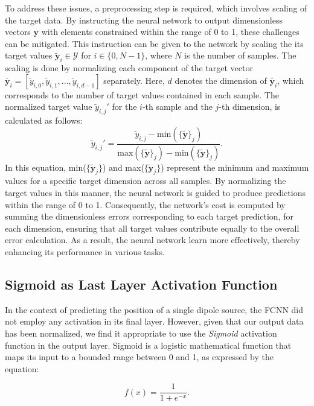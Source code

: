 \documentclass[a4paper, UKenglish, 11pt]{uiomaster}
\begin{document}
To address these issues, a preprocessing step is required, which involves scaling of the target data. By instructing the neural network to output dimensionless vectors $\textbf{{y}}$ with elements constrained within the range of 0 to 1, these challenges can be mitigated.
This instruction can be given to the network by scaling the its target values
$\mathbf{\tilde{y}}_i \in \mathcal{Y}$
for $i \in \{0, N-1\}$, where $N$ is the number of samples. The scaling is done by normalizing each component of the target vector
$\tilde{\mathbf{y}_i} = [\tilde{y}_{i,0}, \tilde{y}_{i,1}, ..., \tilde{y}_{i,d-1}]$
separately. Here, $d$ denotes the dimension of $\tilde{\mathbf{y}_i}$, which corresponds to the number of target values contained in each sample. The normalized target value $\tilde{y}_{i,j}'$ for the $i$-th sample and the $j$-th dimension, is calculated as follows:
\begin{equation}
  \tilde{y}_{i,j}' = \frac{\tilde{y}_{i,j} - \text{min}(\{\tilde{\mathbf{y}}\}_j)}{\text{max}(\{\tilde{\mathbf{y}}\}_j) - \text{min}(\{\tilde{\mathbf{y}}\}_j)}.
  \label{eq:scale_target}
\end{equation}
In this equation, min($\{\tilde{\mathbf{y}}_j\}$) and max($\{\tilde{\mathbf{y}}_j\}$) represent the minimum and maximum values for a specific target dimension across all samples. By normalizing the target values in this manner, the neural network is guided to produce predictions within the range of 0 to 1. Consequently, the network's cost is computed by summing the dimensionless errors corresponding to each target prediction, for each dimension, ensuring that all target values contribute equally to the overall error calculation. As a result, the neural network learn more effectively, thereby enhancing its performance in various tasks.



\subsection{Sigmoid as Last Layer Activation Function}
In the context of predicting the position of a single dipole source, the FCNN did not employ any activation in its final layer. However, given that our output data has been normalized, we find it appropriate to use the \emph{Sigmoid} activation function in the output layer. Sigmoid is a logistic mathematical function that maps its input to a bounded range between 0 and 1, as expressed by the equation:

\begin{equation}
  f(x) = \frac{1}{1 + e^{-x}}.
\label{eq:Sigmoid}
\end{equation}
\end{document}

